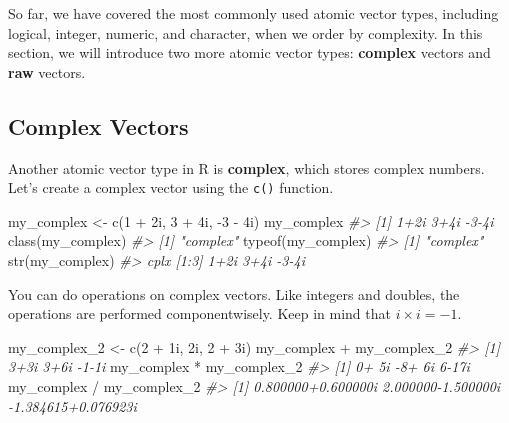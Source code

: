 \documentclass[
]{book}
\newenvironment{Shaded}{\begin{snugshade}}{\end{snugshade}}
\newcommand{\CommentTok}[1]{\textcolor[rgb]{0.56,0.35,0.01}{\textit{#1}}}
\newcommand{\DecValTok}[1]{\textcolor[rgb]{0.00,0.00,0.81}{#1}}
\newcommand{\FunctionTok}[1]{\textcolor[rgb]{0.00,0.00,0.00}{#1}}
\newcommand{\NormalTok}[1]{#1}
\newcommand{\OtherTok}[1]{\textcolor[rgb]{0.56,0.35,0.01}{#1}}
\newcommand{\SpecialCharTok}[1]{\textcolor[rgb]{0.00,0.00,0.00}{#1}}
\begin{document}
So far, we have covered the most commonly used atomic vector types, including logical, integer, numeric, and character, when we order by complexity. In this section, we will introduce two more atomic vector types: \textbf{complex} vectors and \textbf{raw} vectors.

\hypertarget{complex-vectors}{%
\subsection{Complex Vectors}\label{complex-vectors}}

Another atomic vector type in R is \textbf{complex}, which stores complex numbers. Let's create a complex vector using the \texttt{c()} function.

\begin{Shaded}
\begin{Highlighting}[]
\NormalTok{my\_complex }\OtherTok{\textless{}{-}} \FunctionTok{c}\NormalTok{(}\DecValTok{1} \SpecialCharTok{+}\NormalTok{ 2i, }\DecValTok{3} \SpecialCharTok{+}\NormalTok{ 4i, }\SpecialCharTok{{-}}\DecValTok{3} \SpecialCharTok{{-}}\NormalTok{ 4i)}
\NormalTok{my\_complex}
\CommentTok{\#\textgreater{} [1]  1+2i  3+4i {-}3{-}4i}
\FunctionTok{class}\NormalTok{(my\_complex)}
\CommentTok{\#\textgreater{} [1] "complex"}
\FunctionTok{typeof}\NormalTok{(my\_complex)}
\CommentTok{\#\textgreater{} [1] "complex"}
\FunctionTok{str}\NormalTok{(my\_complex)}
\CommentTok{\#\textgreater{}  cplx [1:3] 1+2i 3+4i {-}3{-}4i}
\end{Highlighting}
\end{Shaded}

You can do operations on complex vectors. Like integers and doubles, the operations are performed componentwisely. Keep in mind that \(i \times i = -1\).

\begin{Shaded}
\begin{Highlighting}[]
\NormalTok{my\_complex\_2 }\OtherTok{\textless{}{-}} \FunctionTok{c}\NormalTok{(}\DecValTok{2} \SpecialCharTok{+}\NormalTok{ 1i,   2i, }\DecValTok{2} \SpecialCharTok{+}\NormalTok{ 3i)}
\NormalTok{my\_complex }\SpecialCharTok{+}\NormalTok{ my\_complex\_2}
\CommentTok{\#\textgreater{} [1]  3+3i  3+6i {-}1{-}1i}
\NormalTok{my\_complex }\SpecialCharTok{*}\NormalTok{ my\_complex\_2}
\CommentTok{\#\textgreater{} [1]  0+ 5i {-}8+ 6i  6{-}17i}
\NormalTok{my\_complex }\SpecialCharTok{/}\NormalTok{ my\_complex\_2}
\CommentTok{\#\textgreater{} [1]  0.800000+0.600000i  2.000000{-}1.500000i {-}1.384615+0.076923i}
\end{Highlighting}
\end{Shaded}
\end{document}
